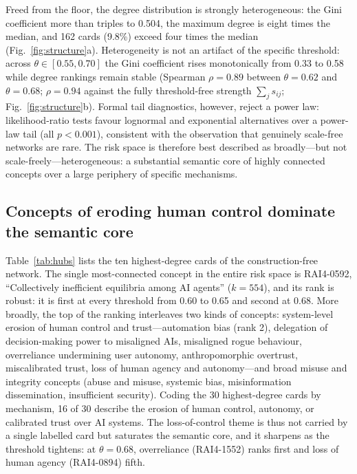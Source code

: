 \documentclass[fleqn,10pt]{wlscirep}
\begin{document}
Freed from the floor, the degree distribution is strongly heterogeneous:
the Gini coefficient more than triples to 0.504, the maximum degree is
eight times the median, and 162 cards (9.8\%) exceed four times the median
(Fig.~\ref{fig:structure}a). Heterogeneity is not an artifact of the
specific threshold: across $\theta \in [0.55, 0.70]$ the Gini coefficient
rises monotonically from 0.33 to 0.58 while degree rankings remain stable
(Spearman $\rho = 0.89$ between $\theta=0.62$ and $\theta=0.68$; $\rho =
0.94$ against the fully threshold-free strength $\sum_j s_{ij}$;
Fig.~\ref{fig:structure}b). Formal tail diagnostics, however, reject a
power law: likelihood-ratio tests\cite{clauset2009} favour lognormal and
exponential alternatives over a power-law tail (all $p<0.001$), consistent
with the observation that genuinely scale-free networks are
rare\cite{broido2019}. The risk space is therefore best described as
broadly---but not scale-freely---heterogeneous: a substantial semantic core
of highly connected concepts over a large periphery of specific mechanisms.

\subsection*{Concepts of eroding human control dominate the semantic core}

Table~\ref{tab:hubs} lists the ten highest-degree cards of the
construction-free network. The single most-connected concept in the entire
risk space is RAI4-0592, ``Collectively inefficient equilibria among AI
agents'' ($k=554$), and its rank is robust: it is first at every threshold
from 0.60 to 0.65 and second at 0.68. More broadly, the top of the ranking
interleaves two kinds of concepts: system-level erosion of human control
and trust---automation bias (rank 2), delegation of decision-making power
to misaligned AIs, misaligned rogue behaviour, overreliance undermining
user autonomy, anthropomorphic overtrust, miscalibrated trust, loss of
human agency and autonomy---and broad misuse and integrity concepts (abuse
and misuse, systemic bias, misinformation dissemination, insufficient
security). Coding the 30 highest-degree cards by mechanism, 16 of 30
describe the erosion of human control, autonomy, or calibrated trust over
AI systems. The loss-of-control theme is thus not carried by a single
labelled card but saturates the semantic core, and it sharpens as the
threshold tightens: at $\theta=0.68$, overreliance (RAI4-1552) ranks first
and loss of human agency (RAI4-0894) fifth.
\end{document}
